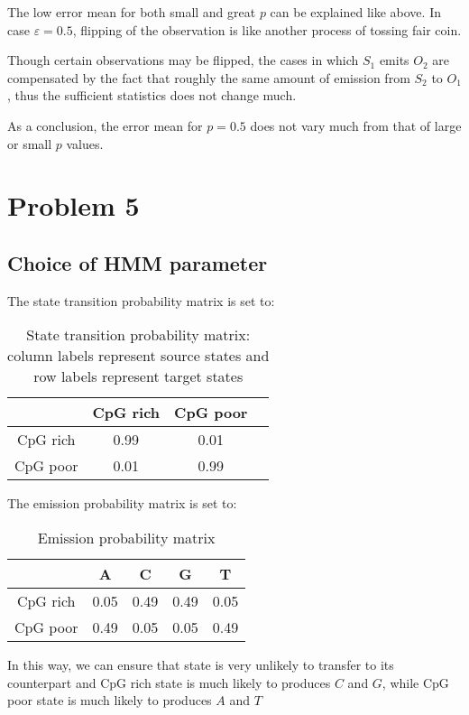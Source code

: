 \documentclass[paper=a4, fontsize=11pt]{scrartcl} %
\numberwithin{equation}{section} %
\numberwithin{figure}{section} %
\numberwithin{table}{section} %
\begin{document}
The low error mean for both small and great $p$ can be explained like above. In case $\varepsilon=0.5$, flipping of the observation is like another process of tossing fair coin.

Though certain observations may be flipped, the cases in which $S_1$ emits $O_2$ are compensated by the fact that roughly the same amount of emission from $S_2$ to $O_1$, thus the sufficient statistics does not change much.

As a conclusion, the error mean for $p=0.5$ does not vary much from that of large or small $p$ values.

\section{Problem 5}
\subsection {Choice of HMM parameter}

The state transition probability matrix is set to:

\begin{table}[H]
\caption{State transition probability matrix: column labels represent source states and row labels represent target states}
\centering
\begin{tabular}{c|ccc}
  & CpG rich & CpG poor  \\ \hline
  CpG rich & 0.99 & 0.01 \\
  CpG poor & 0.01 & 0.99
\end {tabular}
\end {table}


The emission probability matrix is set to:

\begin{table}[H]
\caption{Emission probability matrix}
\centering
\begin{tabular}{c|cccc}
  & A & C & G & T  \\ \hline
  CpG rich & 0.05 & 0.49 & 0.49 & 0.05 \\
  CpG poor & 0.49 & 0.05 & 0.05 & 0.49
\end {tabular}
\end {table}

In this way, we can ensure that state is very unlikely to transfer to its  counterpart and CpG rich state is much likely to produces $C$ and $G$, while CpG poor state is much likely to produces $A$ and $T$
\end{document}
